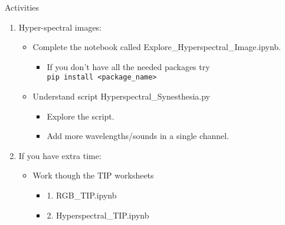 \documentclass{beamer}
\begin{document}
\begin{frame}{Activities}
   \begin{enumerate}
      \item Hyper-spectral images:
      \begin{itemize}
         \item Complete the notebook called Explore\_Hyperspectral\_Image.ipynb.
         \begin{itemize}
            \item If you don't have all the needed packages try \\ \texttt{pip install <package\_name>}
         \end{itemize}
         \item Understand script Hyperspectral\_Synesthesia.py
         \begin{itemize}
            \item Explore the script.
            \item Add more wavelengths/sounds in a single channel.
         \end{itemize}
      \end{itemize}
      \item If you have extra time:
      \begin{itemize}
         \item Work though the TIP worksheets
         \begin{itemize}
            \item 1. RGB\_TIP.ipynb
            \item 2. Hyperspectral\_TIP.ipynb
         \end{itemize}
      \end{itemize}
   \end{enumerate}
\end{frame}
\end{document}

